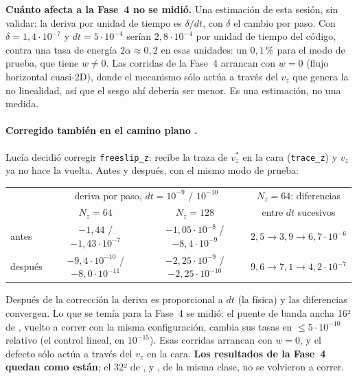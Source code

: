 \textbf{Cuánto afecta a la Fase~4 no se midió.} Una estimación de esta sesión, sin validar:
la deriva por unidad de tiempo es $\delta/dt$, con $\delta$ el cambio por paso. Con
$\delta=1{,}4\cdot10^{-7}$ y $dt=5\cdot10^{-4}$ serían $2{,}8\cdot10^{-4}$ por unidad de
tiempo del código, contra una tasa de energía $2\alpha\approx0{,}2$ en esas unidades: un
$0{,}1$\,\% para el modo de prueba, que tiene $w\neq0$. Las corridas de la Fase~4 arrancan
con $w=0$ (flujo horizontal cuasi-2D), donde el mecanismo sólo actúa a través del $v_z$ que
genera la no linealidad, así que el sesgo ahí debería ser menor. Es una estimación, no una
medida.
\paragraph{Corregido también en el camino plano .} Lucía decidió corregir
\texttt{freeslip\_z}: recibe la traza de $v^*_z$ en la cara (\texttt{trace\_z}) y $v_z$ ya no
hace la vuelta. Antes y después, con el mismo modo de prueba:

\begin{center}\footnotesize
\begin{tabular}{lccc}
\toprule
 & \multicolumn{2}{c}{deriva por paso, $dt=10^{-9}$ / $10^{-10}$} & $N_z=64$: diferencias \\
 & $N_z=64$ & $N_z=128$ & entre $dt$ sucesivos\\
\midrule
antes & $-1{,}44$ / $-1{,}43\cdot10^{-7}$ & $-1{,}05\cdot10^{-8}$ / $-8{,}4\cdot10^{-9}$ & $2{,}5\to3{,}9\to6{,}7\cdot10^{-6}$\\
después & $-9{,}4\cdot10^{-10}$ / $-8{,}0\cdot10^{-11}$ & $-2{,}25\cdot10^{-9}$ / $-2{,}25\cdot10^{-10}$ & $9{,}6\to7{,}1\to4{,}2\cdot10^{-7}$\\
\bottomrule
\end{tabular}
\end{center}

Después de la corrección la deriva es proporcional a $dt$ (la física) y las diferencias
convergen. Lo que se temía para la Fase~4 se midió: el puente de banda ancha 16² de
, vuelto a correr con la misma configuración, cambia sus tasas en
$\le5\cdot10^{-10}$ relativo (el control lineal, en $10^{-15}$). Esas corridas arrancan con
$w=0$, y el defecto sólo actúa a través del $v_z$ en la cara. \textbf{Los resultados de la
Fase~4 quedan como están}; el 32² de ,  y , de la misma clase,
no se volvieron a correr.
